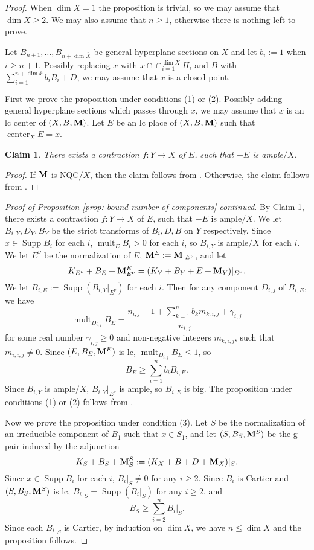 \documentclass[11pt]{amsart}
\numberwithin{equation}{section}
\newcommand{\Mm}{{\bf{M}}}
\newcommand{\Center}{\operatorname{center}}
\newcommand{\Supp}{\operatorname{Supp}}
\newcommand{\mult}{\operatorname{mult}}
\newtheorem{claim}[thm]{Claim}
\theoremstyle{definition}
\theoremstyle{definition}
\theoremstyle{definition}
\begin{document}
\begin{proof}
When $\dim X=1$ the proposition is trivial, so we may assume that $\dim X\geq 2$. We may also assume that $n\geq 1$, otherwise there is nothing left to prove. 

Let $B_{n+1},\dots,B_{n+\dim\bar X}$ be general hyperplane sections on $X$ and let $b_i:=1$ when $i\geq n+1$. Possibly replacing $x$ with $\bar x\cap\cap_{i=1}^{\dim X}H_i$ and $B$ with $\sum_{i=1}^{n+\dim\bar x}b_iB_i+D$, we may assume that $x$ is a closed point. 

First we prove the proposition under conditions (1) or (2). Possibly adding general hyperplane sections which passes through $x$, we may assume that $x$ is an lc center of $(X,B,\Mm)$. Let $E$ be an lc place of $(X,B,\Mm)$ such that  $\Center_XE=x$.
\begin{claim}\label{claim: extract divisor which is ample}
    There exists a contraction $f: Y\rightarrow X$ of $E$, such that $-E$ is ample$/X$.
\end{claim}
\begin{proof}
    If $\Mm$ is NQC$/X$, then the claim follows from \cite[Theorem 1.7]{LX23b}. Otherwise, the claim follows from \cite[Lemma 2.11]{Bir20}.
\end{proof}
\noindent\textit{Proof of Proposition \ref{prop: bound number of components} continued}. By Claim \ref{claim: extract divisor which is ample}, there exists a contraction $f: Y\rightarrow X$ of $E$, such that $-E$ is ample$/X$. We let $B_{i,Y},D_Y,B_Y$ be the strict transforms of $B_{i},D,B$ on $Y$ respectively. Since $x\in\Supp B_i$ for each $i$, $\mult_EB_i>0$ for each $i$, so $B_{i,Y}$ is ample$/X$ for each $i$. We let $E^\nu$ be the normalization of $E$, $\Mm^E:=\Mm|_{E^\nu}$, and let
$$K_{E^\nu}+B_E+\Mm^E_{E^\nu}=(K_Y+B_Y+E+\Mm_Y)|_{E^\nu}.$$
We let $B_{i,E}:=\Supp(B_{i,Y}|_{E^\nu})$ for each $i$. Then for any component $D_{i,j}$ of $B_{i,E}$, we have
$$\mult_{D_{i,j}}B_E=\frac{n_{i,j}-1+\sum_{k=1}^nb_km_{k,i,j}+\gamma_{i,j}}{n_{i,j}}$$
for some real number $\gamma_{i,j}\geq 0$ and non-negative integers $m_{k,i,j}$, such that $m_{i,i,j}\not=0$. Since $(E,B_E,\Mm^E)$ is lc, $\mult_{D_{i,j}}B_E\leq 1$, so $$B_E\geq\sum_{i=1}^nb_iB_{i,E}.$$
Since $B_{i,Y}$ is ample$/X$, $B_{i,Y}|_{E^\nu}$ is ample, so $B_{i,E}$ is big. The proposition under conditions (1) or (2) follows from \cite[Proposition 5.1]{BZ16}.

Now we prove the proposition under condition (3). Let $S$ be the normalization of an irreducible component of $B_1$ such that $x\in S_1$, and let $(S,B_S,\Mm^S)$ be the g-pair induced by the adjunction
$$K_S+B_S+\Mm^S_S:=(K_X+B+D+\Mm_X)|_S.$$
Since $x\in\Supp B_i$ for each $i$, $B_i|_S\not=0$ for any $i\geq 2$. Since $B_i$ is Cartier and $(S,B_S,\Mm^S)$ is lc, $B_i|_S=\Supp(B_i|_S)$ for any $i\geq 2$, and 
$$B_S\geq\sum_{i=2}^nB_i|_S.$$
Since each $B_i|_S$ is Cartier, by induction on $\dim X$, we have $n\leq\dim X$ and the proposition follows.
\end{proof}
\end{document}
